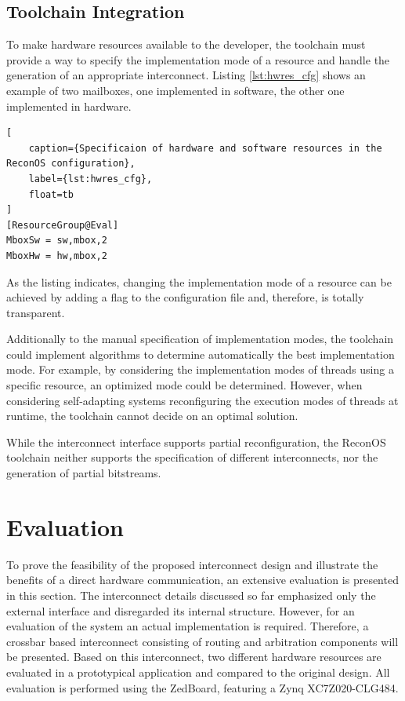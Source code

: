\subsection{Toolchain Integration}
To make hardware resources available to the developer, the toolchain must
provide a way to specify the implementation mode of a resource and handle the
generation of an appropriate interconnect. Listing \ref{lst:hwres_cfg} shows
an example of two mailboxes, one implemented in software, the other one
implemented in hardware.
\begin{lstlisting}[
	caption={Specificaion of hardware and software resources in the ReconOS configuration},
	label={lst:hwres_cfg},
	float=tb
]
[ResourceGroup@Eval]
MboxSw = sw,mbox,2
MboxHw = hw,mbox,2
\end{lstlisting}
As the listing indicates, changing the implementation mode of a resource can
be achieved by adding a flag to the configuration file and, therefore, is
totally transparent.

Additionally to the manual specification of implementation modes, the
toolchain could implement algorithms to determine automatically the best
implementation mode. For example, by considering the implementation modes of
threads using a specific resource, an optimized mode could be determined.
However, when considering self-adapting systems reconfiguring the execution
modes of threads at runtime, the toolchain cannot decide on an optimal
solution.

While the interconnect interface supports partial reconfiguration, the ReconOS
toolchain neither supports the specification of different interconnects, nor
the generation of partial bitstreams.

\section{Evaluation}
To prove the feasibility of the proposed interconnect design and illustrate
the benefits of a direct hardware communication, an extensive evaluation is
presented in this section. The interconnect details discussed so far
emphasized only the external interface and disregarded its internal structure.
However, for an evaluation of the system an actual implementation is required.
Therefore, a crossbar based interconnect consisting of routing and arbitration
components will be presented. Based on this interconnect, two different
hardware resources are evaluated in a prototypical application and compared to
the original design. All evaluation is performed using the ZedBoard, featuring
a Zynq XC7Z020-CLG484.

